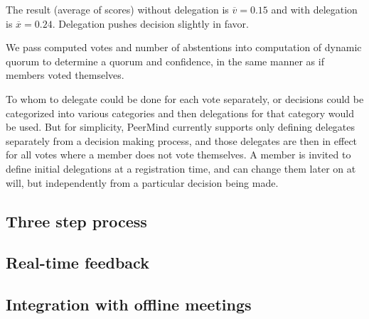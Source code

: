 \documentclass{sigchi}
\begin{document}

The result (average of scores) without delegation is $\overline{v} = 0.15$ and
with delegation is $\overline{x} = 0.24$.
Delegation pushes decision slightly in favor.


We pass computed votes and number of abstentions into computation of dynamic quorum to determine
a quorum and confidence, in the same manner as if members voted themselves.

To whom to delegate could be done for each vote separately, or decisions could be categorized into various
categories and then delegations for that category would be used.
But for simplicity, PeerMind currently supports only defining delegates separately from a decision making process,
and those delegates are then in effect for all votes where a member does not vote themselves.
A member is invited to define initial delegations at a registration time, and can change them later on at will,
but independently from a particular decision being made.

\subsection{Three step process}

\subsection{Real-time feedback}



\subsection{Integration with offline meetings}
\end{document}

